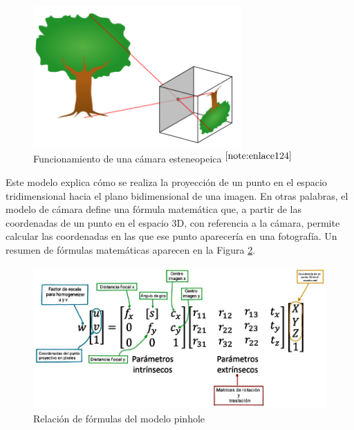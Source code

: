 \begin{figure} [h!]
	\begin{center}
		\includegraphics[width=8cm]{figs/cap6/pinhole.png}
	\end{center}
	\caption{Funcionamiento de una cámara esteneopeica $^{\ref{note:enlace124}}$}
	\label{fig:pinhole}
\end{figure}

\setcounter{footnote}{124} %


Este modelo explica cómo se realiza la proyección de un punto en el espacio tridimensional hacia el plano bidimensional de una imagen. En otras palabras, el modelo de cámara define una fórmula matemática que, a partir de las coordenadas de un punto en el espacio 3D, con referencia a la cámara, permite calcular las coordenadas en las que ese punto aparecería en una fotografía. Un resumen de fórmulas matemáticas aparecen en la Figura \ref{fig:pinholeformula}.

 \begin{figure} [h!]
	\begin{center}
		\includegraphics[width=15cm]{figs/cap6/esquema_pinhole_matrices.jpg}
	\end{center}
	\caption{Relación de fórmulas del modelo pinhole}
	\label{fig:pinholeformula}
\end{figure}
  
